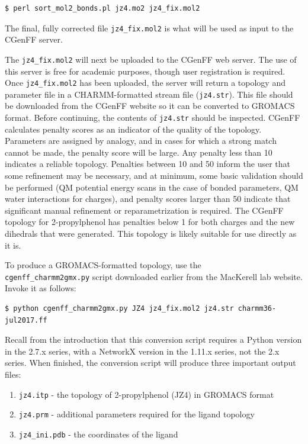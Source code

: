 \documentclass[9pt,tutorial,pubversion]{livecoms}
\begin{document}
\begin{lstlisting}
$ perl sort_mol2_bonds.pl jz4.mo2 jz4_fix.mol2
\end{lstlisting}

The final, fully corrected file \texttt{jz4\_fix.mol2} is what will be used as input to the CGenFF server.

The \texttt{jz4\_fix.mol2} will next be uploaded to the CGenFF web server. The use of this server is free for academic purposes, though user registration is required. Once \texttt{jz4\_fix.mol2} has been uploaded, the server will return a topology and parameter file in a CHARMM-formatted stream file (\texttt{jz4.str}). This file should be downloaded from the CGenFF website so it can be converted to GROMACS format. Before continuing, the contents of \texttt{jz4.str} should be inspected. CGenFF calculates penalty scores as an indicator of the quality of the topology. Parameters are assigned by analogy, and in cases for which a strong match cannot be made, the penalty score will be large. Any penalty less than 10 indicates a reliable topology. Penalties between 10 and 50 inform the user that some refinement may be necessary, and at minimum, some basic validation should be performed (QM potential energy scans in the case of bonded parameters, QM water interactions for charges), and penalty scores larger than 50 indicate that significant manual refinement or reparametrization is required. The CGenFF topology for 2-propylphenol has penalties below 1 for both charges and the new dihedrals that were generated. This topology is likely suitable for use directly as it is.

To produce a GROMACS-formatted topology, use the \\\texttt{cgenff\_charmm2gmx.py} script downloaded earlier from the MacKerell lab website. Invoke it as follows:

\begin{lstlisting}
$ python cgenff_charmm2gmx.py JZ4 jz4_fix.mol2 jz4.str charmm36-jul2017.ff
\end{lstlisting}

Recall from the introduction that this conversion script requires a Python version in the 2.7.x series, with a NetworkX version in the 1.11.x series, not the 2.x series. When finished, the conversion script will produce three important output files:

\begin{enumerate}
	\item \texttt{jz4.itp} - the topology of 2-propylphenol (JZ4) in GROMACS format
	\item \texttt{jz4.prm} - additional parameters required for the ligand topology
	\item \texttt{jz4\_ini.pdb} - the coordinates of the ligand
\end{enumerate}
\end{document}
